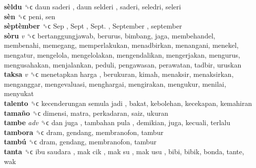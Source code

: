 \textbf{sèldu} ␝ϲ   daun saderi ,  daun selderi , saderi, seledri, seleri  \\
\textbf{sèn} ␝ϲ  peni, sen  \\
\textbf{sèptèmber} ␝ϲ   Sep ,  Sept ,  Sept. ,  September , september  \\
\textbf{sòru} \emph{v}  ␝ϲ  bertanggungjawab, berurus, bimbang, jaga, membehandel, membenahi, memegang, memperlakukan, menadbirkan, menangani, menekel, mengatur, mengelola, mengelolakan, mengendalikan, mengerjakan, mengurus, mengusahakan, menjalankan, peduli, pengawasan, perawatan, tadbir, uruskan  \\
\textbf{taksa} \emph{v}  ␝ϲ   menetapkan harga , berukuran, kimah, menaksir, menaksirkan, menganggar, mengevaluasi, menghargai, mengirakan, mengukur, menilai, menyukat  \\
\textbf{talento} ␝ϲ   kecenderungan semula jadi , bakat, kebolehan, kecekapan, kemahiran  \\
\textbf{tamaño} ␝ϲ  dimensi, matra, perkadaran, saiz, ukuran  \\
\textbf{tambe} \emph{adv}  ␝ϲ   dan juga ,  tambahan pula , demikian, juga, kecuali, terlalu  \\
\textbf{tambora} ␝ϲ  dram, gendang, membranofon, tambur  \\
\textbf{tambú} ␝ϲ  dram, gendang, membranofon, tambur  \\
\textbf{tanta} ␝ϲ   ibu saudara ,  mak cik ,  mak su ,  mak usu , bibi, bibik, bonda, tante, wak  \\
